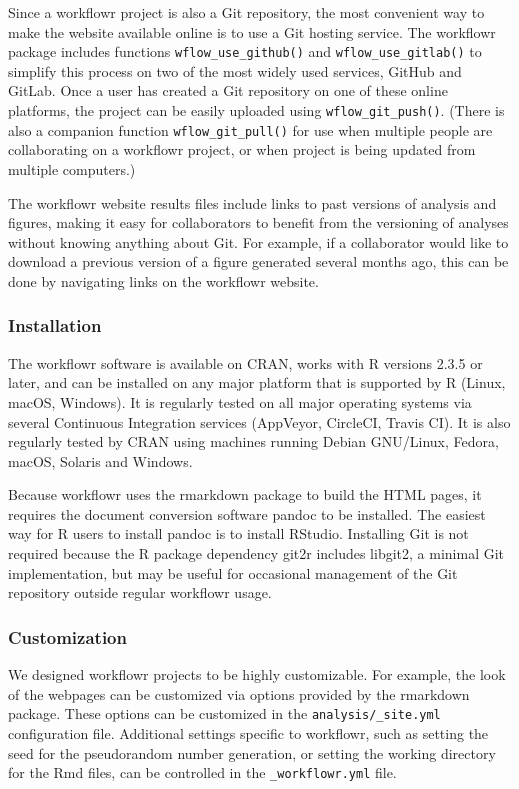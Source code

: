 \documentclass[9pt,a4paper]{extarticle}
\begin{document}
Since a workflowr project is also a Git repository, the most convenient
way to make the website available online is to use a Git hosting
service. The workflowr package includes functions \texttt{wflow\_use\_github()} and
\texttt{wflow\_use\_gitlab()} to simplify this process on two of the most widely
used services, GitHub and GitLab. Once a user has created a Git
repository on one of these online platforms, the project can be easily
uploaded using \texttt{wflow\_git\_push()}. (There is also a companion function
\texttt{wflow\_git\_pull()} for use when multiple people are collaborating on a
workflowr project, or when project is being updated from multiple
computers.)

The workflowr website results files include links to past versions of
analysis and figures, making it easy for collaborators to benefit from
the versioning of analyses without knowing anything about Git. For
example, if a collaborator would like to download a previous version of
a figure generated several months ago, this can be done by navigating
links on the workflowr website.

\subsubsection*{Installation}

The workflowr software is available on CRAN, works with R versions 2.3.5
or later, and can be installed on any major platform that is supported
by R (Linux, macOS, Windows). It is regularly tested on all major
operating systems via several Continuous Integration services (AppVeyor,
CircleCI, Travis CI). It is also regularly tested by CRAN using machines
running Debian GNU/Linux, Fedora, macOS, Solaris and Windows.

Because workflowr uses the rmarkdown package to build the HTML pages, it
requires the document conversion software pandoc to be installed. The
easiest way for R users to install pandoc is to install RStudio.
Installing Git is not required because the R package dependency git2r
includes libgit2, a minimal Git implementation, but may be useful for
occasional management of the Git repository outside regular workflowr
usage.

\subsubsection*{Customization}

We designed workflowr projects to be highly customizable. For example,
the look of the webpages can be customized via options provided by the
rmarkdown package. These options can be customized in the
\verb|analysis/_site.yml| configuration file. Additional settings
specific to workflowr, such as setting the seed for the pseudorandom
number generation, or setting the working directory for the Rmd files,
can be controlled in the \verb|_workflowr.yml| file.
\end{document}

